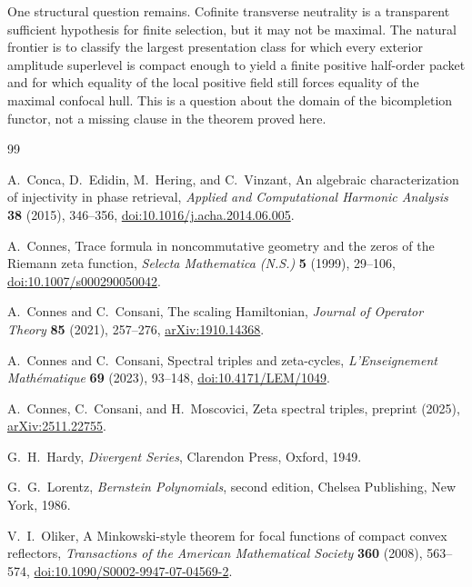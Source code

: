 \documentclass[11pt]{article}
\theoremstyle{remark}
\begin{document}
One structural question remains.  Cofinite transverse neutrality is a transparent sufficient
hypothesis for finite selection, but it may not be maximal.  The natural frontier is to classify
the largest presentation class for which every exterior amplitude superlevel is compact enough
to yield a finite positive half-order packet and for which equality of the local positive field
still forces equality of the maximal confocal hull.  This is a question about the domain of the
bicompletion functor, not a missing clause in the theorem proved here.

\begin{thebibliography}{99}

A.~Conca, D.~Edidin, M.~Hering, and C.~Vinzant,
\newblock An algebraic characterization of injectivity in phase retrieval,
\newblock \emph{Applied and Computational Harmonic Analysis} \textbf{38} (2015), 346--356,
\newblock \href{https://doi.org/10.1016/j.acha.2014.06.005}{doi:10.1016/j.acha.2014.06.005}.

A.~Connes,
\newblock Trace formula in noncommutative geometry and the zeros of the Riemann zeta function,
\newblock \emph{Selecta Mathematica (N.S.)} \textbf{5} (1999), 29--106,
\newblock \href{https://doi.org/10.1007/s000290050042}{doi:10.1007/s000290050042}.

A.~Connes and C.~Consani,
\newblock The scaling Hamiltonian,
\newblock \emph{Journal of Operator Theory} \textbf{85} (2021), 257--276,
\newblock \href{https://arxiv.org/abs/1910.14368}{arXiv:1910.14368}.

A.~Connes and C.~Consani,
\newblock Spectral triples and zeta-cycles,
\newblock \emph{L'Enseignement Math\'ematique} \textbf{69} (2023), 93--148,
\newblock \href{https://doi.org/10.4171/LEM/1049}{doi:10.4171/LEM/1049}.

A.~Connes, C.~Consani, and H.~Moscovici,
\newblock Zeta spectral triples,
\newblock preprint (2025),
\newblock \href{https://arxiv.org/abs/2511.22755}{arXiv:2511.22755}.

G.~H.~Hardy,
\newblock \emph{Divergent Series},
\newblock Clarendon Press, Oxford, 1949.

G.~G.~Lorentz,
\newblock \emph{Bernstein Polynomials}, second edition,
\newblock Chelsea Publishing, New York, 1986.

V.~I.~Oliker,
\newblock A Minkowski-style theorem for focal functions of compact convex reflectors,
\newblock \emph{Transactions of the American Mathematical Society} \textbf{360} (2008), 563--574,
\newblock \href{https://doi.org/10.1090/S0002-9947-07-04569-2}{doi:10.1090/S0002-9947-07-04569-2}.


\end{thebibliography}
\end{document}
